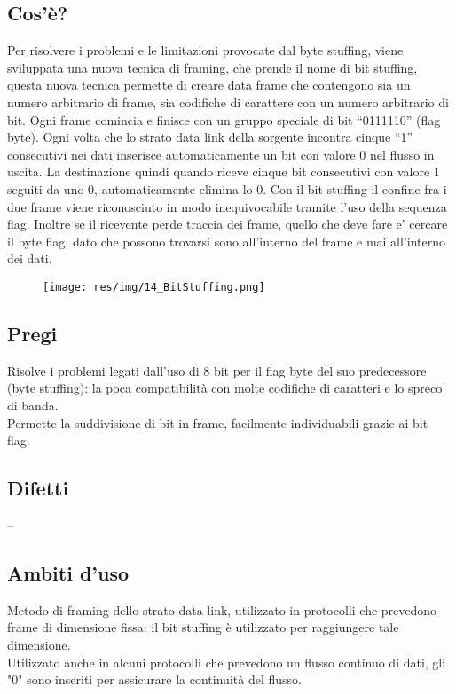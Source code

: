 \subsection{Cos'è?}
Per risolvere i problemi e le limitazioni provocate dal byte stuffing, viene sviluppata una nuova tecnica di framing, che prende il nome di bit stuffing, questa nuova tecnica permette di creare data frame che contengono sia un numero arbitrario di frame, sia codifiche di carattere con un numero arbitrario di bit.
Ogni frame comincia e finisce con un gruppo speciale di bit “0111110” (flag byte). Ogni volta che lo strato data link della sorgente incontra cinque “1” consecutivi nei dati inserisce automaticamente un bit con valore 0 nel flusso in uscita. La destinazione quindi quando riceve cinque bit consecutivi con valore 1 seguiti da uno 0, automaticamente elimina lo 0.
Con il bit stuffing il confine fra i due frame viene riconosciuto in modo inequivocabile tramite l'uso della sequenza flag. Inoltre se il ricevente perde traccia dei frame, quello che deve fare e' cercare il byte flag, dato che possono trovarsi sono all'interno del frame e mai all'interno dei dati.

\begin{figure}[H]
\centering
\texttt{[image: res/img/14\_BitStuffing.png]}
\end{figure}

\subsection{Pregi}
Risolve i problemi legati dall'uso di 8 bit per il flag byte del suo predecessore (byte stuffing): la poca compatibilità con molte codifiche di caratteri e lo spreco di banda.\\
Permette la suddivisione di bit in frame, facilmente individuabili grazie ai bit flag.

\subsection{Difetti}
--
\subsection{Ambiti d'uso}
Metodo di framing dello strato data link, utilizzato in protocolli che prevedono frame di dimensione fissa: il bit stuffing è utilizzato per raggiungere tale dimensione.\\
Utilizzato anche in alcuni protocolli che prevedono un flusso continuo di dati, gli "0" sono inseriti per assicurare la continuità del flusso.

